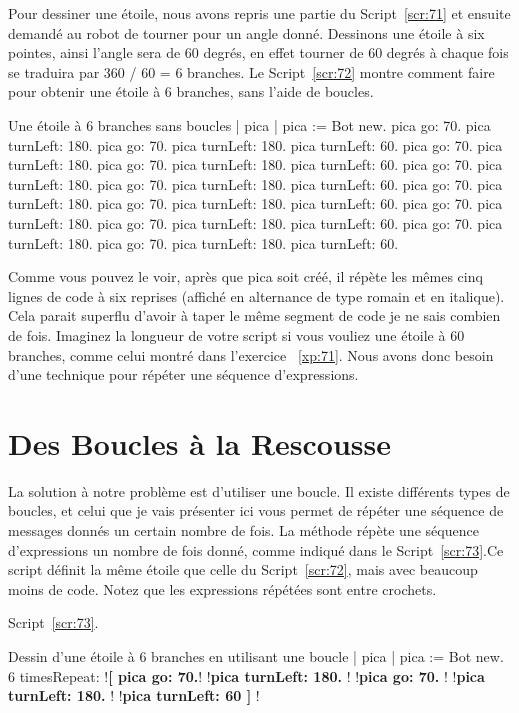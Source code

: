 \documentclass[a4paper,10pt,twoside]{book}
\begin{document}
Pour dessiner une étoile, nous avons repris une partie du Script~\ref{scr:71} et ensuite 
demandé au robot de tourner pour un angle donné. Dessinons une étoile à six pointes, ainsi 
l'angle sera de 60 degrés, en effet tourner de 60 degrés à chaque fois se traduira par 
360 / 60 = 6 branches. Le Script~\ref{scr:72} montre comment faire pour obtenir une étoile 
à 6 branches, sans l'aide de boucles. 


\begin{script}[72]{Une étoile à 6 branches sans boucles}
| pica | 
pica := Bot new. 
pica go: 70. 
pica turnLeft: 180. 
pica go: 70. 
pica turnLeft: 180. 
pica turnLeft: 60. 
pica go: 70. 
pica turnLeft: 180. 
pica go: 70. 
pica turnLeft: 180. 
pica turnLeft: 60. 
pica go: 70. 
pica turnLeft: 180. 
pica go: 70. 
pica turnLeft: 180. 
pica turnLeft: 60. 
pica go: 70. 
pica turnLeft: 180. 
pica go: 70. 
pica turnLeft: 180. 
pica turnLeft: 60. 
pica go: 70. 
pica turnLeft: 180. 
pica go: 70. 
pica turnLeft: 180. 
pica turnLeft: 60. 
pica go: 70. 
pica turnLeft: 180. 
pica go: 70. 
pica turnLeft: 180. 
pica turnLeft: 60.
\end{script}

Comme vous pouvez le voir, après que pica soit créé, il répète les mêmes cinq lignes de 
code à six reprises (affiché en alternance de type romain et en italique). Cela parait 
superflu d'avoir à taper le même segment de code je ne sais combien de fois. Imaginez la 
longueur de votre script si vous vouliez une étoile à 60 branches, comme celui montré dans 
l'exercice ~\ref{xp:71}. Nous avons donc besoin d'une technique pour répéter une séquence d'expressions.

\section{Des Boucles à la Rescousse} 

La solution à notre problème est d'utiliser une boucle. Il existe différents types de 
boucles, et celui que je vais présenter ici vous permet de répéter une séquence de messages 
donnés un certain nombre de fois. La méthode  répète une séquence d'expressions 
un nombre de fois donné, comme indiqué dans le Script~\ref{scr:73}.Ce script définit la même étoile que celle du Script~\ref{scr:72}, 
mais avec beaucoup moins de code. Notez que les expressions répétées sont entre crochets.

Script~\ref{scr:73}.

\begin{script}[73]{Dessin d'une étoile à 6 branches en utilisant une boucle}
| pica | 
pica := Bot new. 
6 timesRepeat: 
	!\textbf{[ pica go: 70.}!
	!\textbf{pica turnLeft: 180. }!
	!\textbf{pica go: 70. }!
	!\textbf{pica turnLeft: 180. }!
	!\textbf{pica turnLeft: 60 ] }!
\end{script}
\end{document}
